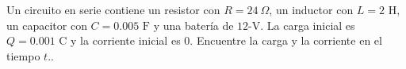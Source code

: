 \item Un circuito en serie contiene un resistor con $R = 24 \ \Omega$, un inductor con $L = 2 \text{ H}$, un capacitor con $C = 0.005 \text{ F}$ y una batería de $12\text{-V}$. La carga inicial es $Q = 0.001 \text{ C}$ y la corriente inicial es $0$. Encuentre la carga y la corriente en el tiempo $t$..
